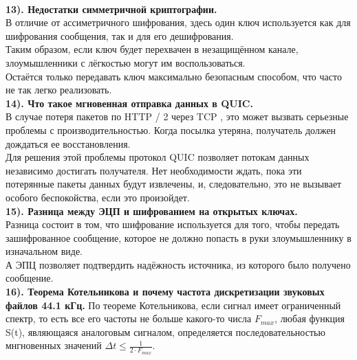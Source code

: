 \documentclass[11pt,a4paper]{article}
\begin{document}
\\
\textbf{13). Недостатки симметричной криптографии.}
\\
В отличие от ассиметричного шифрования, здесь один ключ используется как для шифрования сообщения, так и для его дешифрования.
\\
Таким образом, если ключ будет перехвачен в незащищённом канале, злоумышленники с лёгкостью могут им воспользоваться.
\\
Остаётся только передавать ключ максимально безопасным способом, что часто не так легко реализовать.
\\
\textbf{14). Что такое мгновенная отправка данных в QUIC.}
\\
В случае потеря пакетов по HTTP / 2 через TCP , это может вызвать серьезные проблемы с производительностью. Когда посылка утеряна, получатель должен дождаться ее восстановления.
\\
Для решения этой проблемы протокол QUIC позволяет потокам данных независимо достигать получателя. Нет необходимости ждать, пока эти потерянные пакеты данных будут извлечены, и, следовательно, это не вызывает особого беспокойства, если это произойдет.
\\
\textbf{15). Разница между ЭЦП и шифрованием на открытых ключах.}
\\
Разница состоит в том, что шифрование используется для того, чтобы передать зашифрованное сообщение, которое не должно попасть в руки злоумышленнику в изначальном виде.
\\
А ЭПЦ позволяет подтвердить надёжность источника, из которого было получено сообщение.
\\
\textbf{16). Теорема Котельникова и почему частота дискретизации звуковых файлов 44.1 кГц.}
По теореме Котельникова, если сигнал имеет ограниченный спектр, то есть все его частоты не больше какого-то числа $F_{max}$, любая функция S(t), являющаяся аналоговым сигналом, определяется последовательностью мнгновенных значений $\Delta t \leq \frac{1}{2 \cdot F_{max}}$.
\\
\end{document}
